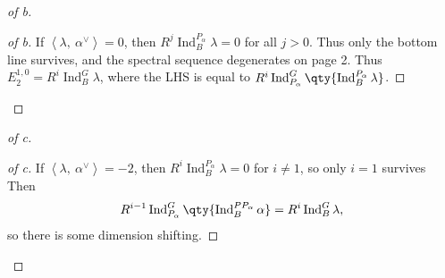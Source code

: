 \begin{proof}[of b]

\begin{proof}[of b]

If \({\left\langle {\lambda},~{\alpha^\vee} \right\rangle} = 0\), then
\(R^j \operatorname{Ind}_B^{P_\alpha} \lambda = 0\) for all \(j>0\).
Thus only the bottom line survives, and the spectral sequence
degenerates on page 2. Thus
\(E_2^{1, 0} = R^i \operatorname{Ind}_B^G \lambda\), where the LHS is
equal to
\(R^i \operatorname{Ind}_{P_\alpha}^G \qty{\operatorname{Ind}_B^{P_\alpha} \lambda }\).

\end{proof}

\end{proof}

\begin{proof}[of c]

\begin{proof}[of c]

If \({\left\langle {\lambda},~{\alpha^\vee} \right\rangle} = -2\), then
\(R^i \operatorname{Ind}_B^{P_\alpha} \lambda = 0\) for \(i\neq 1\), so
only \(i=1\) survives Then
\begin{align*} R^{i-1} \operatorname{Ind}_{P_\alpha}^G \qty{ \operatorname{Ind}_B^{PP_\alpha} \alpha} = R^i \operatorname{Ind}_B^G \lambda ,\end{align*}
so there is some dimension shifting.

\end{proof}

\end{proof}

